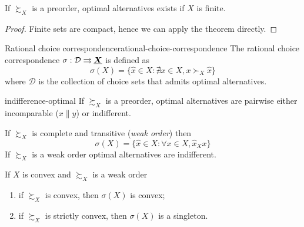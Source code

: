 \documentclass[12pt]{extarticle}
\renewcommand{\vec}[1]{\uvec{#1}}
\begin{document}
\begin{corollary}{}{}
    If $\succsim_X$ is a preorder, optimal alternatives exists if $X$ is finite.
\end{corollary}

\begin{proof}
    Finite sets are compact, hence we can apply the theorem directly.
\end{proof}

\begin{definition}{Rational choice correspondence}{rational-choice-correspondence}
    The rational choice correspondence $\sigma : \mathcal D \rightrightarrows \vec X$ is defined as
    \begin{equation}
        \sigma (X) = \{ \hat x \in X: \nexists x \in X, x \succ_X \hat x \}
    \end{equation}
    where $\mathcal D$ is the collection of choice sets that admits optimal alternatives.
\end{definition}

\begin{lemma}{}{indifference-optimal}
    If $\succsim_X$ is a preorder, optimal alternatives are pairwise either incomparable ($x \parallel y$) or indifferent.
\end{lemma}

If $\succsim_X$ is complete and transitive (\emph{weak order}) then
\begin{equation}
    \sigma(X) = \{\hat x \in X : \forall x \in X, \hat x_X x\}
\end{equation}
If $\succsim_X$ is a weak order optimal alternatives are indifferent.

\begin{proposition}{}{}
    If $X$ is convex and $\succsim_X$ is a weak order
    \begin{enumerate}[label=\roman*.]
        \item if $\succsim_X$ is convex, then $\sigma(X)$ is convex;
        \item if $\succsim_X$ is strictly convex, then $\sigma(X)$ is a singleton.
    \end{enumerate}
\end{proposition}
\end{document}
